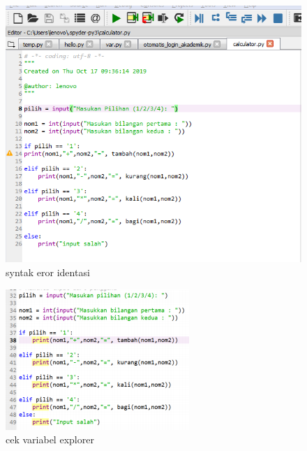 	\begin{figure}
	\includegraphics[scale=0.5]{section/salah.png}
	\centering
	\caption{syntak eror identasi}
	\end{figure}
	
	\begin{figure}
	\includegraphics[scale=1.5]{section/benar.png}
	\centering
	\caption{cek variabel explorer}
	\end{figure}